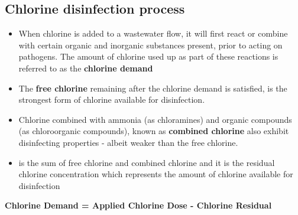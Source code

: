 \subsection{Chlorine disinfection process}

\linespread{1.5}
\begin{itemize}
\item When chlorine is added to a wastewater flow, it will first react or combine with certain organic and inorganic substances present, prior to acting on pathogens.  The amount of chlorine used up as part of these reactions is referred to as the \textbf{chlorine demand}\\

\item The \textbf{free chlorine} remaining after the chlorine demand is satisfied, is the strongest form of chlorine available for disinfection.  

\item Chlorine combined with ammonia (as chloramines) and organic compounds (as chloroorganic compounds), known as \textbf{combined chlorine} also exhibit disinfecting properties - albeit weaker than the free chlorine.

\item {} is the sum of free chlorine and combined chlorine and it is the residual chlorine concentration which represents the amount of chlorine available for disinfection 
\end{itemize}
\textbf{Chlorine Demand = Applied Chlorine Dose - Chlorine Residual}\\

